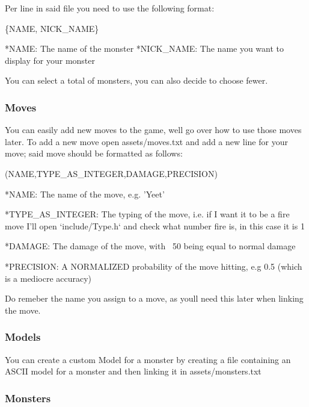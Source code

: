 Per line in said file you need to use the following format\+: 
\begin{DoxyCode}
\{NAME, NICK\_NAME\}

*NAME: The name of the monster
*NICK\_NAME: The name you want to display for your monster
\end{DoxyCode}


You can select a total of {} monsters, you can also decide to choose fewer.

\subsubsection*{Moves}

You can easily add new moves to the game, we\textquotesingle{}ll go over how to use those moves later. To add a new move open {\ttfamily assets/moves.\+txt} and add a new line for your move; said move should be formatted as follows\+: 
\begin{DoxyCode}
(NAME,TYPE\_AS\_INTEGER,DAMAGE,PRECISION)


*NAME:  The name of the move, e.g. 'Yeet'

*TYPE\_AS\_INTEGER: The typing of the move, i.e. if I want it to be a fire move I'll open `include/Type.h`
       and check what number fire is, in this case it is 1

*DAMAGE: The damage of the move, with ~50 being equal to normal damage

*PRECISION: A NORMALIZED probability of the move hitting, e.g 0.5 (which is a mediocre accuracy)
\end{DoxyCode}
 Do remeber the name you assign to a move, as you\textquotesingle{}ll need this later when linking the move.

\subsubsection*{Models}

You can create a custom Model for a monster by creating a file containing an A\+S\+C\+II model for a monster and then linking it in {\ttfamily assets/monsters.\+txt}

\subsubsection*{Monsters}

